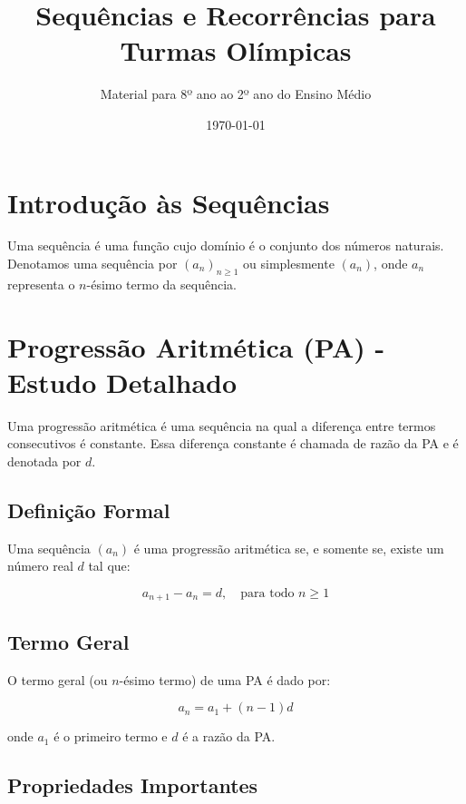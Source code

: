 \documentclass[12pt,a4paper]{article}
\title{\textbf{Sequências e Recorrências para Turmas Olímpicas}}
\author{Material para 8º ano ao 2º ano do Ensino Médio}
\date{\today}
\begin{document}
\maketitle

\tableofcontents

\newpage

\section{Introdução às Sequências}

Uma sequência é uma função cujo domínio é o conjunto dos números naturais. Denotamos uma sequência por $(a_n)_{n \geq 1}$ ou simplesmente $(a_n)$, onde $a_n$ representa o $n$-ésimo termo da sequência.

\section{Progressão Aritmética (PA) - Estudo Detalhado}

Uma progressão aritmética é uma sequência na qual a diferença entre termos consecutivos é constante. Essa diferença constante é chamada de razão da PA e é denotada por $d$.

\subsection{Definição Formal}

Uma sequência $(a_n)$ é uma progressão aritmética se, e somente se, existe um número real $d$ tal que:

\begin{equation}
a_{n+1} - a_n = d, \quad \text{para todo } n \geq 1
\end{equation}

\subsection{Termo Geral}

O termo geral (ou $n$-ésimo termo) de uma PA é dado por:

\begin{equation}
a_n = a_1 + (n-1)d
\end{equation}

onde $a_1$ é o primeiro termo e $d$ é a razão da PA.

\subsection{Propriedades Importantes}
\end{document}
